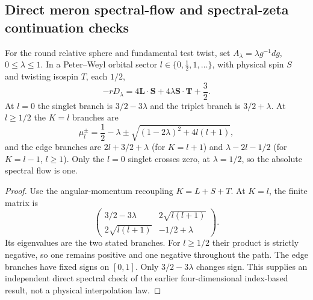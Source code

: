 \documentclass[11pt,a4paper]{article}
\begin{document}
\clearpage
\subsection{Direct meron spectral-flow and spectral-zeta continuation checks}
\label{p3g:sec:v349-meron-hodge-analytic}
\begin{proposition}
\label{p3g:prop:v349-meron-one-crossing}
For the round relative sphere and fundamental test twist, set
$A_\lambda=\lambda g^{-1}dg$, $0\leq\lambda\leq1$.
In a Peter--Weyl orbital sector $l\in\{0,\tfrac12,1,\ldots\}$,
with physical spin $S$ and twisting isospin $T$, each $1/2$,
\[
 -rD_\lambda=4\mathbf L\cdot\mathbf S
 +4\lambda\mathbf S\cdot\mathbf T+\frac32.
\]
At $l=0$ the singlet branch is $3/2-3\lambda$
and the triplet branch is $3/2+\lambda$.  At $l\ge1/2$
the $K=l$ branches are
\[
 \mu_l^\pm=\frac12-\lambda
 \pm\sqrt{(1-2\lambda)^2+4l(l+1)},
\]
and the edge branches are $2l+3/2+\lambda$
(for $K=l+1$) and $\lambda-2l-1/2$
(for $K=l-1$, $l\ge1$).  Only the $l=0$ singlet crosses
zero, at $\lambda=1/2$, so the absolute spectral flow is one.
\end{proposition}
\begin{proof}
Use the angular-momentum recoupling $K=L+S+T$.
At $K=l$, the finite matrix is
\[
 \begin{pmatrix}
 3/2-3\lambda&2\sqrt{l(l+1)}\\
 2\sqrt{l(l+1)}&-1/2+\lambda
 \end{pmatrix}.
\]
Its eigenvalues are the two stated branches.  For
$l\ge1/2$ their product is strictly negative, so one
remains positive and one negative throughout the path.
The edge branches have fixed signs on $[0,1]$.
Only $3/2-3\lambda$ changes sign.  This supplies an
independent direct spectral check of the earlier four-dimensional
index-based result, not a physical interpolation law.
\end{proof}
\end{document}
